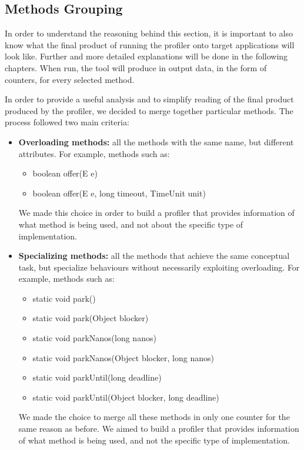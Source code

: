 \documentclass[]{usiinfthesis}
\begin{document}
 
 \subsection{Methods Grouping}
 In order to understand the reasoning behind this section, it is important to also know what the final product of running the profiler onto target applications will look like. Further and more detailed explanations will be done in the following chapters. When run, the tool will produce in output data, in the form of counters, for every selected method.
 
 In order to provide a useful analysis and to simplify reading of the final product produced by the profiler, we decided to merge together particular methods. The process followed two main criteria:
 \begin{itemize}
     \item \textbf{Overloading methods: }all the methods with the same name, but different attributes. For example, methods such as:
     \begin{itemize}
         \item boolean offer(E e)
         \item boolean offer(E e, long timeout, TimeUnit unit)
     \end{itemize}
     We made this choice in order to build a profiler that provides information of what method is being used, and not about the specific type of implementation.
 \end{itemize}
 \begin{itemize}
     \item \textbf{Specializing methods: }all the methods that achieve the same conceptual task, but specialize behaviours without necessarily exploiting overloading. For example, methods such as:
     \begin{itemize}
         \item static void park()
         \item static void park(Object blocker)
         \item static void parkNanos(long nanos)
         \item static void parkNanos(Object blocker, long nanos)
         \item static void parkUntil(long deadline)
         \item static void parkUntil(Object blocker, long deadline)
     \end{itemize}
     We made the choice to merge all these methods in only one counter for the same reason as before. We aimed to build a profiler that provides information of what method is being used, and not the specific type of implementation.
 \end{itemize}
 
\end{document}
